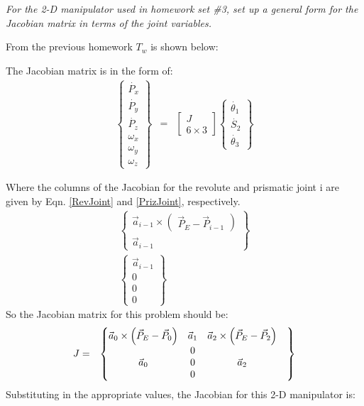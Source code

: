 \begin{homeworkProblem}
\textit{For the 2-D manipulator used in homework set \#3, set up a general form for the Jacobian matrix in terms of the joint variables.}

From the previous homework $T_w$ is shown below:


The Jacobian matrix is in the form of:
\begin{eqnarray}
\begin{Bmatrix}
\dot{P_x} \\
\dot{P_y} \\
\dot{P_z} \\
\omega_x \\
\omega_y \\
\omega_z
\end{Bmatrix} &=&
\begin{bmatrix}
J \\
6 \times 3
\end{bmatrix}
\begin{Bmatrix}
\dot{\theta_1} \\
\dot{S_2} \\
\dot{\theta_3}
\end{Bmatrix}
\end{eqnarray}

Where the columns of the Jacobian for the revolute and prismatic joint i are given by Eqn. \ref{RevJoint} and \ref{PrizJoint}, respectively.
\begin{eqnarray}
\begin{Bmatrix}
\vec{a}_{i-1}\times\begin{pmatrix}\vec{P}_E-\vec{P}_{i-1}\end{pmatrix} \\
\vec{a}_{i-1}
\end{Bmatrix} \label{RevJoint} \\
\begin{Bmatrix}
\vec{a}_{i-1} \\ 0 \\ 0 \\ 0
\end{Bmatrix} \label{PrizJoint}
\end{eqnarray} 
So the Jacobian matrix for this problem should be:
\begin{eqnarray}
J&=&\begin{Bmatrix}
\vec{a}_0 \times \left(\vec{P}_E-\vec{P}_{0}\right) 	&
\vec{a}_1									&
\vec{a}_2 \times \left(\vec{P}_E-\vec{P}_{2}\right) 	\\
&
0&
\\
\vec{a}_0&
0  &
\vec{a}_2&
\\
&
0     &
\end{Bmatrix}
\end{eqnarray}
Substituting in the appropriate values, the Jacobian for this 2-D manipulator is:



\end{homeworkProblem}

